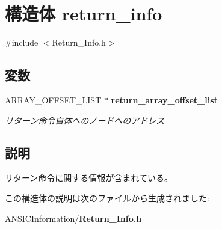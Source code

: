 \section{構造体 return\_\-info}
\label{structreturn__info}


{\ttfamily \#include $<$Return\_\-Info.h$>$}

\subsection*{変数}
\begin{DoxyCompactItemize}
\item 
ARRAY\_\-OFFSET\_\-LIST $\ast$ {\bf return\_\-array\_\-offset\_\-list}\label{structreturn__info_a4a73b7eb55cc8db61c9175f7f0d98a40}

\begin{DoxyCompactList}\small\item\em リターン命令自体へのノードへのアドレス \item\end{DoxyCompactList}\end{DoxyCompactItemize}


\subsection{説明}
リターン命令に関する情報が含まれている。 

この構造体の説明は次のファイルから生成されました:\begin{DoxyCompactItemize}
\item 
ANSICInformation/{\bf Return\_\-Info.h}\end{DoxyCompactItemize}
